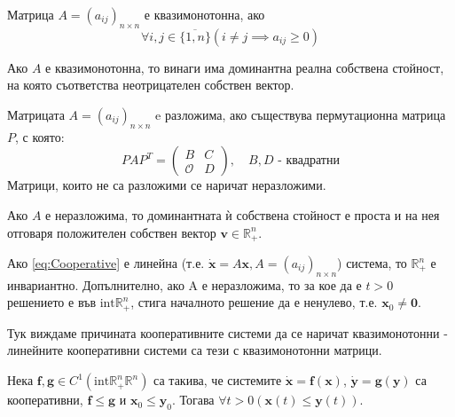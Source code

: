 \begin{definition}
  Матрица $A=(a_{ij})_{n \times n}$ е квазимонотонна, ако
  \begin{equation*}
    \forall{i,j \in \{\overline{1,n}\}} \left(i \neq j \implies a_{ij} \geq 0\right)
  \end{equation*}
\end{definition}

\begin{theorem}
  Ако $A$ е квазимонотонна, то винаги има доминантна реална собствена стойност, на която съответства неотрицателен собствен вектор.
\end{theorem}

\begin{definition}
  Матрицата $A=(a_{ij})_{n \times n}$ e разложима, ако съществува пермутационна матрица $P$, с която:
  \begin{equation*}
    PAP^T =
    \begin{pmatrix}
      B & C \\
      \mathscr{O} & D
    \end{pmatrix}, \quad B, D \text{ - квадратни}
  \end{equation*}
  Матрици, които не са разложими се наричат неразложими.
\end{definition}

\begin{theorem}
  Ако $A$ е неразложима, то доминантната ѝ собствена стойност е проста и на нея отговаря положителен собствен вектор $\mathbf{v} \in \mathbb{R}_{+}^n$.
\end{theorem}

\begin{theorem}
  Ако \eqref{eq:Cooperative} е линейна (т.е. $\dot{\mathbf{x}} = A \mathbf{x}, A = (a_{ij})_{n \times n}$) система, то $\mathbb{R}_{+}^n$ е инвариантно.
  Допълнително, ако A е неразложима, то за кое да е $t > 0$ решението е във $\mathrm{int} \mathbb{R}_{+}^n$, стига началното решение да е ненулево, т.е. $\mathbf{x}_0 \neq \mathbf{0}$.
\end{theorem}

Тук виждаме причината кооперативните системи да се наричат квазимонотонни - линейните кооперативни системи са тези с квазимонотонни матрици.

\begin{theorem}
  \label{thm:Comparison}
  Нека $\mathbf{f}, \mathbf{g} \in C^1(\mathrm{int} \mathbb{R}_{+}^n \mathbb{R}^n)$ са такива, че системите $\dot{\mathbf{x}}=\mathbf{f}(\mathbf{x})$, $\dot{\mathbf{y}}=\mathbf{g}(\mathbf{y})$ са кооперативни, $\mathbf{f} \leq \mathbf{g}$ и $\mathbf{x}_0 \leq \mathbf{y}_0$. Тогава $\forall{t>0}(\mathbf{x}(t) \leq \mathbf{y}(t))$.
\end{theorem}

